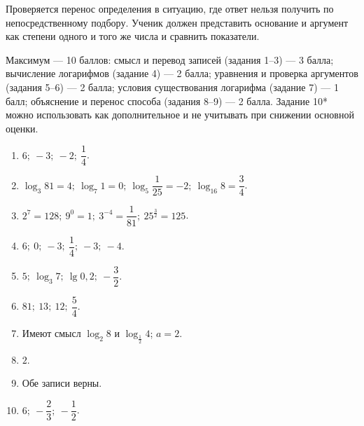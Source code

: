 \begin{criterionbox}
  Проверяется перенос определения в ситуацию, где ответ нельзя получить по
  непосредственному подбору. Ученик должен представить основание и аргумент
  как степени одного и того же числа и сравнить показатели.
\end{criterionbox}

\begin{criterionbox}
  Максимум --- 10 баллов: смысл и перевод записей (задания 1--3) ---
  3 балла; вычисление логарифмов (задание 4) --- 2 балла; уравнения и
  проверка аргументов (задания 5--6) --- 2 балла; условия существования
  логарифма (задание 7) --- 1 балл; объяснение и перенос способа
  (задания 8--9) --- 2 балла. Задание 10* можно использовать как
  дополнительное и не учитывать при снижении основной оценки.
\end{criterionbox}

\begin{resultbox}
  \begin{enumerate}[itemsep=0.28em,topsep=0.25em]
    \item \(6;\ -3;\ -2;\ \dfrac14\).
    \item \(\log_3 81=4;\ \log_7 1=0;\
      \log_5\dfrac1{25}=-2;\ \log_{16}8=\dfrac34\).
    \item \(2^7=128;\ 9^0=1;\ 3^{-4}=\dfrac1{81};\
      25^{\frac32}=125\).
    \item \(6;\ 0;\ -3;\ \dfrac14;\ -3;\ -4\).
    \item \(5;\ \log_3 7;\ \lg0{,}2;\ -\dfrac32\).
    \item \(81;\ 13;\ 12;\ \dfrac54\).
    \item Имеют смысл \(\log_2 8\) и \(\log_{\frac12}4\); \(a=2\).
    \item \(2\).
    \item Обе записи верны.
    \item \(6;\ -\dfrac23;\ -\dfrac12\).
  \end{enumerate}
\end{resultbox}
